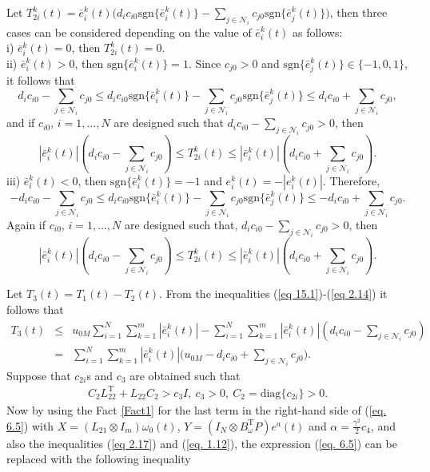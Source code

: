 \documentclass[12pt,draftcls,onecolumn]{IEEEtran}
\begin{document}
Let $T_{2i}^k(t)=\bar e_i^k(t) \big(d_ic_{i0}\text{sgn}\{ \bar e_i^k(t)\}-\sum_{j\in\mathcal{N}_i}c_{j0}\text{sgn}\{\bar e_j^k(t)\}\big)$, then three cases can be considered depending on the value of $\bar e_i^k(t)$ as follows:\\
i) $\bar e_i^k(t)=0$, then $T_{2i}^k(t)=0$.\\
ii) $\bar e_i^k(t)>0$, then $\text{sgn}\{ \bar e_i^k(t)\}=1$. Since $c_{j0}>0$ and $\text{sgn}\{\bar e_j^k(t)\}\in\{-1,0,1\}$, it follows that
$$d_ic_{i0}-\sum_{j\in\mathcal{N}_i} c_{j0}\leq d_ic_{i0}\text{sgn}\{ \bar e_i^k(t)\}-\sum_{j\in\mathcal{N}_i}c_{j0}\text{sgn}\{\bar e_j^k(t)\}\leq d_ic_{i0}+\sum_{j\in\mathcal{N}_i}c_{j0},$$
and if $c_{i0}$, $i=1,\dots,N$ are designed such that $d_ic_{i0}-\sum_{j\in\mathcal{N}_i} c_{j0}>0$, then 
\begin{equation}
|\bar e_i^k(t)|( d_ic_{i0}-\sum_{j\in\mathcal{N}_i}c_{j0}) \leq T_{2i}^k(t)\leq |\bar e_i^k(t)|(d_ic_{i0}+\sum_{j\in\mathcal{N}_i}c_{j0}).\label{eq 2.13}
\end{equation}
iii) $\bar e_i^k(t)<0$, then $\text{sgn}\{ \bar e_i^k(t)\}=-1$ and $e_i^k(t)=-|e_i^k(t)|$. Therefore,
$$-d_ic_{i0}-\sum_{j\in\mathcal{N}_i} c_{j0}\leq d_ic_{i0}\text{sgn}\{ \bar e_i^k(t)\}-\sum_{j\in\mathcal{N}_i}c_{j0}\text{sgn}\{\bar e_j^k(t)\}\leq -d_ic_{i0}+\sum_{j\in\mathcal{N}_i}c_{j0}.$$
Again if $c_{i0}$, $i=1,\dots,N$ are designed such that, $d_ic_{i0}-\sum_{j\in\mathcal{N}_i} c_{j0}>0$, then
\begin{equation}
|\bar e_i^k(t)|( d_ic_{i0}-\sum_{j\in\mathcal{N}_i}c_{j0}) \leq T_{2i}^k(t)\leq |\bar e_i^k(t)|(d_ic_{i0}+\sum_{j\in\mathcal{N}_i}c_{j0}).\label{eq 2.14}
\end{equation}\par
Let $T_3(t)=T_1(t)-T_2(t)$. From the  inequalities  (\ref{eq 15.1})-(\ref{eq 2.14})  it follows that
\begin{eqnarray}
T_3(t)&\leq& u_{0M}\sum_{i=1}^N{\sum_{k=1}^{m}|\bar e_i^k(t)|}-\sum_{i=1}^N{\sum_{k=1}^{m} |\bar e_i^k(t)|( d_ic_{i0}-\sum_{j\in\mathcal{N}_i}c_{j0})}\nonumber\\
&=&\sum_{i=1}^N\sum_{k=1}^{m}|\bar e_i^k(t)|\big(u_{0M}-d_ic_{i0}+\sum_{j\in\mathcal{N}_i}c_{j0}\big).\label{eq 2.17}
\end{eqnarray}
Suppose that $c_{2i}$s and $c_3$ are obtained such that
\begin{eqnarray}
C_2L_{22}^{\text{T}}+L_{22}C_2>c_3I,\ c_3>0,\ C_2=\text{diag}\{c_{2i}\}>0.\label{eq. 1.12}
\end{eqnarray} 
Now by using the Fact \ref{Fact1} for the last term in the right-hand side of  (\ref{eq. 6.5}) with $X=(L_{21}\otimes I_{m})\omega_0(t)$, $Y=(I_N\otimes B_{\omega}^{\text{T}}P)e^a(t)$ and $\alpha=\frac{\gamma^2}{2}c_4$, and also the inequalities (\ref{eq 2.17}) and (\ref{eq. 1.12}), the expression (\ref{eq. 6.5}) can be replaced with the following inequality
\end{document}
